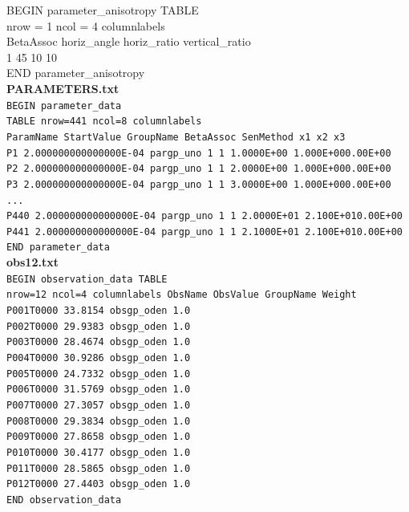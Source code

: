 \documentclass[11pt,oneside,onecolumn]{usgsreport}
\begin{document}
\begin{appendix}
{BEGIN parameter\_anisotropy TABLE\\
nrow = 1 ncol = 4 columnlabels \\
BetaAssoc horiz\_angle horiz\_ratio vertical\_ratio \\
1 45 10 10 \\
END parameter\_anisotropy}
\\
\textbf{PARAMETERS.txt} \\
\texttt{BEGIN parameter\_data \\
TABLE nrow=441 ncol=8 columnlabels \\
ParamName StartValue GroupName BetaAssoc SenMethod x1 x2 x3 \\
P1 2.000000000000000E-04 pargp\_uno 1 1 1.0000E+00 1.000E+000.00E+00 \\
P2 2.000000000000000E-04 pargp\_uno 1 1 2.0000E+00 1.000E+000.00E+00 \\
P3 2.000000000000000E-04 pargp\_uno 1 1 3.0000E+00 1.000E+000.00E+00\\
...\\
P440 2.000000000000000E-04 pargp\_uno 1 1 2.0000E+01 2.100E+010.00E+00 \\
P441 2.000000000000000E-04 pargp\_uno 1 1 2.1000E+01 2.100E+010.00E+00 \\
END parameter\_data}
\\

\textbf{obs12.txt} \\
\texttt{BEGIN observation\_data TABLE \\
nrow=12 ncol=4 columnlabels ObsName ObsValue GroupName Weight \\
P001T0000 33.8154 obsgp\_oden 1.0 \\
P002T0000 29.9383 obsgp\_oden 1.0 \\
P003T0000 28.4674 obsgp\_oden 1.0 \\
P004T0000 30.9286 obsgp\_oden 1.0 \\
P005T0000 24.7332 obsgp\_oden 1.0 \\
P006T0000 31.5769 obsgp\_oden 1.0 \\
P007T0000 27.3057 obsgp\_oden 1.0 \\
P008T0000 29.3834 obsgp\_oden 1.0 \\
P009T0000 27.8658 obsgp\_oden 1.0 \\
P010T0000 30.4177 obsgp\_oden 1.0 \\
P011T0000 28.5865 obsgp\_oden 1.0 \\
P012T0000 27.4403 obsgp\_oden 1.0 } \\
\texttt{END observation\_data \pagebreak{}}


\end{appendix}
\end{document}
